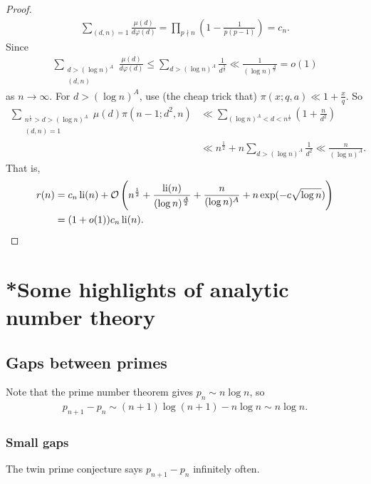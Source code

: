 \documentclass{article}
\newcommand{\1}{\mathbbm{1}}
\newcommand{\bigO}{\mathcal{O}}
\DeclareMathOperator\li{li}
\begin{document}
\begin{enumerate}
\begin{proof}
\begin{align*}
        \sum_{(d,n) = 1} \frac{\mu(d)}{d \varphi(d)} = \prod_{p \nmid n} \left(1 - \frac{1}{p(p-1)}\right) = c_n.
      \end{align*}
      Since
      \begin{align*}
        \sum_{\substack{d > (\log n)^A \\ (d,n)}} \frac{\mu(d)}{d \varphi(d)} \leq \sum_{d > (\log n)^A} \frac{1}{d^{\frac 32}} \ll \frac{1}{(\log n)^{\frac A2}} = o(1)
      \end{align*}
      as $n \to \infty$.
      For $d > (\log n)^A$, use (the cheap trick that) $\pi(x;q,a) \ll 1 + \frac{x}{q}$.
      So
      \begin{align*}
        \sum_{\substack{n^{\frac 12} > d > (\log n)^A \\ (d,n)=1}} \mu(d) \pi(n-1;d^2,n) &\ll \sum_{(\log n)^A < d < n^{\frac 12}} (1 + \frac{n}{d^2}) \\
                                                                                         &\ll n^{\frac 12} + n \sum_{d > (\log n)^A} \frac{1}{d^2} \ll \frac{n}{(\log n)^A}.
      \end{align*}
      That is,
      \begin{align*}
        r(n) &= c_n \li(n) + \bigO\left(n^{\frac 12} + \frac{\li(n)}{(\log n)^{\frac A2}} + \frac{n}{(\log n)^A} + n \exp(-c \sqrt{\log n})\right) \\&= (1 + o(1)) c_n \li(n). \qedhere
      \end{align*}
    \end{proof}
\end{enumerate}

\clearpage
\section{*Some highlights of analytic number theory}
\subsection{Gaps between primes}
\newlec
Note that the prime number theorem gives $p_n \sim n \log n$, so
\begin{align*}
  p_{n+1} - p_n \sim (n+1) \log (n+1) - n \log n \sim n \log n.
\end{align*}
\subsubsection{Small gaps}
The twin prime conjecture says $p_{n+1} - p_n$ infinitely often.
\end{document}
